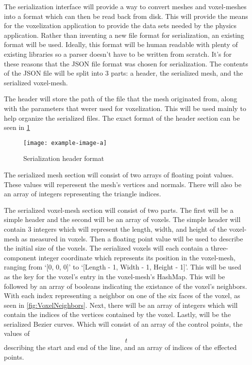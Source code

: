 The serialization interface will provide a way to convert meshes and voxel-meshes into a format 
which can then be read back from disk. This will provide the means for the voxelization application
to provide the data sets needed by the physics application. Rather than inventing a new file format 
for serialization, an existing format will be used. Ideally, this format will be human readable with 
plenty of existing libraries so a parser doesn't have to be written from scratch. It's for these
reasons that the JSON file format was chosen for serialization. The contents of the JSON file will 
be split into 3 parts: a header, the serialized mesh, and the serialized voxel-mesh.

The header will store the path of the file that the mesh originated from, along with the parameters 
that werer used for voxelization. This will be used mainly to help organize the serialized files.
The exact format of the header section can be seen in \ref{fig:SerializationHeader}

\begin{figure}[h]
  \centering
  \texttt{[image: example-image-a]}
  \caption{Serialization header format}
  \label{fig:SerializationHeader}
\end{figure}

The serialized mesh section will consist of two arrays of floating point values. These values 
will reperesent the mesh's vertices and normals. There will also be an array of integers 
representing the triangle indices.

The serialized voxel-mesh section will consist of two parts. The first will be a simple header and 
the second will be an array of voxels. The simple header will contain 3 integers which will 
represent the length, width, and height of the voxel-mesh as measured in voxels. Then a floating 
point value will be used to describe the initial size of the voxels. The serialized voxels will each
contain a three-component integer coordinate which represents its position in the voxel-mesh, 
ranging from `[0, 0, 0]' to `[Length - 1, Width - 1, Height - 1]'. This will be used as the key for 
the voxel's entry in the voxel-mesh's HashMap. This will be followed by an array of booleans 
indicating the existance of the voxel's neighbors. With each index representing a neighbor on one 
of the six faces of the voxel, as seen in \ref{fig:VoxelNeighbors}. Next, there will be an array of
integers which will contain the indices of the vertices contained by the voxel. Lastly, will be the 
serialized Bezier curves. Which will consist of an array of the control points, the values of \[t\]
describing the start and end of the line, and an array of indices of the effected points.

